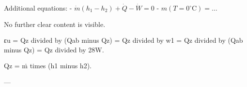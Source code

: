 Additional equations:  
- \( \dot{m} (h_1 - h_2) + \dot{Q} - \dot{W} = 0 \)  
- \( m (T = 0^\circ \text{C}) = \dots \)  

No further clear content is visible.

εu = Qz divided by (Qab minus Qz) = Qz divided by w1 = Qz divided by (Qab minus Qz) = Qz divided by 28W.  

Qz = ṁ times (h1 minus h2).  

---